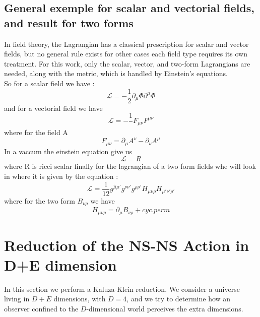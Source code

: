 \documentclass{article}
\begin{document}
\subsection{General exemple for scalar and vectorial fields, and result for two forms}
In field theory, the Lagrangian has a classical prescription for scalar and vector fields, but no general rule exists for other cases 
each field type requires its own treatment. 
For this work, only the scalar, vector, and two-form Lagrangians are needed, along with the metric, which is handled by Einstein's equations.\\
So for a scalar field we have : 
\begin{equation} \label{scalafield}
    \boxed{\mathcal{L} = - \frac{1}{2} \partial_\mu \Phi \partial^ \mu \Phi}
\end{equation}
and for a vectorial field we have
\begin{equation}\label{vectorialfield}
    \boxed{\mathcal{L} = - \frac{1}{}F_{\mu \nu}F^{\mu \nu}}
\end{equation}
where for the field A
\begin{equation*}
    F_{\mu \nu} = \partial_\mu A^ \nu - \partial_\nu A^ \mu
\end{equation*}
In a vaccum the einstein equation give us
\begin{equation*} \label{einsteinaction}
    \boxed{\mathcal{L} = R}
\end{equation*}
where R is ricci scalar
finally for the lagrangian of a two form fields
whe will look in \cite{maharana1993noncompact} where it is given by the equation :  
\begin{equation} \label{Baction}
    \boxed{\mathcal{L} = \frac{1}{12} g^{ \hat \mu  \mu'} g^{\nu \nu'} g^{\rho \rho'} H_{ \mu \nu \rho}H_{ \mu'\nu' \rho'}}
\end{equation}
where for the two form $B_{\nu \rho}$ we have
\begin{equation*}
    H_{ \mu \nu \rho} = \partial_ \mu B_{\nu \rho} + cyc. perm
\end{equation*}

\section{Reduction of the NS-NS Action in D+E dimension}
In this section we perform a Kaluza-Klein reduction. We consider a universe living in $D+E$ dimensions, with $D=4$, and we try to determine how an observer confined to the $D$-dimensional world perceives the extra dimensions.
\end{document}
